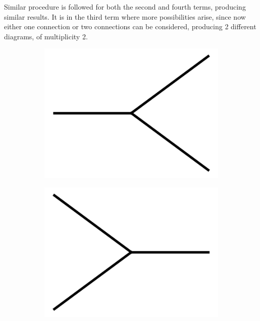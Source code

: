 \documentclass[11pt,a4paper,twoside,pdf]{article}
\numberwithin{equation}{section}
\begin{document}
Similar procedure is followed for both the second and fourth terms, producing similar results.
It is in the third term where more possibilities arise, since now either one 
connection or two connections can be considered, producing 2 different diagrams, of multiplicity 2.

\begin{figure}[h!]
  \centering
    \begin{subfigure}[t]{.1\textwidth}
    \includegraphics[width=\textwidth]{plots/2to1.png}
    \end{subfigure}%
    \begin{subfigure}[t]{.1\textwidth}
    \includegraphics[width=\textwidth]{plots/1to2.png}

\end{subfigure}
\end{figure}
\end{document}
